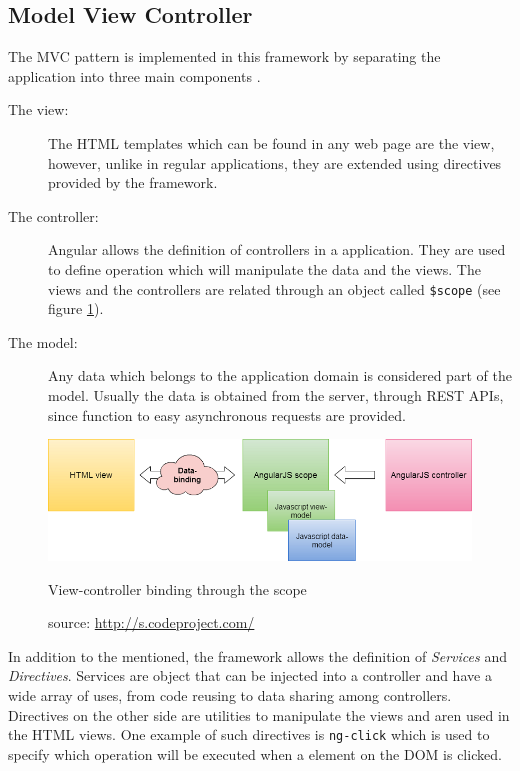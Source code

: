 \subsection*{Model View Controller}

The MVC pattern is implemented in this framework by separating the application into three main components \cite{angularjs3}.

\begin{description}
\item[The view:] The HTML templates which can be found in any web page are the view, however, unlike in regular applications, they are extended using directives provided by the framework.
\item[The controller:] Angular allows the definition of controllers in a application. They are used to define operation which will manipulate the data and the views. The views and the controllers are related through an object called \texttt{\$scope} (see figure \ref{fig:angularscope}).
\item[The model:] Any data which belongs to the application domain is considered part of the model. Usually the data is obtained from the server, through REST APIs, since function to easy asynchronous requests are provided.
\end{description}

\begin{figure}[ht]
  \centering
  \includegraphics[width=.8\textwidth]{fig/angular-scope}
  \caption{View-controller binding through the scope}
  \caption*{source: \url{http://s.codeproject.com/}}
  \label{fig:angularscope}
\end{figure} 

In addition to the mentioned, the framework allows the definition of \textit{Services} and \textit{Directives}. Services are object that can be injected into a controller and have a wide array of uses, from code reusing to data sharing among controllers. Directives on the other side are utilities to manipulate the views and aren  used in the HTML views. One example of such directives is \texttt{ng-click} which is used to specify which operation will be executed when a element on the DOM is clicked.

